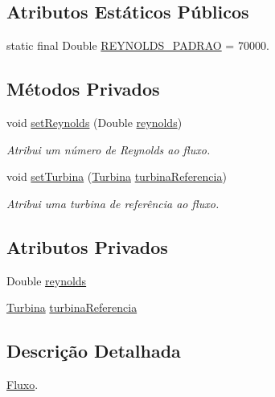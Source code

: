 \subsection*{Atributos Estáticos Públicos}
\begin{DoxyCompactItemize}
\item 
static final Double \hyperlink{classusina_1_1_fluxo_ad85aeeb220a6c87764d29ce36bb8cc26}{R\-E\-Y\-N\-O\-L\-D\-S\-\_\-\-P\-A\-D\-R\-A\-O} = 70000.
\end{DoxyCompactItemize}
\subsection*{Métodos Privados}
\begin{DoxyCompactItemize}
\item 
void \hyperlink{classusina_1_1_fluxo_a1c204862a651d75929b078355b512823}{set\-Reynolds} (Double \hyperlink{classusina_1_1_fluxo_a185fed046eefce4fa8f8bb10fde8296d}{reynolds})
\begin{DoxyCompactList}\small\item\em Atribui um número de Reynolds ao fluxo. \end{DoxyCompactList}\item 
void \hyperlink{classusina_1_1_fluxo_a3bb30b3608a7ab915ff332018a18d81f}{set\-Turbina} (\hyperlink{classusina_1_1_turbina}{Turbina} \hyperlink{classusina_1_1_fluxo_aee04932f02b1bfad1bf79cc80a1df203}{turbina\-Referencia})
\begin{DoxyCompactList}\small\item\em Atribui uma turbina de referência ao fluxo. \end{DoxyCompactList}\end{DoxyCompactItemize}
\subsection*{Atributos Privados}
\begin{DoxyCompactItemize}
\item 
Double \hyperlink{classusina_1_1_fluxo_a185fed046eefce4fa8f8bb10fde8296d}{reynolds}
\item 
\hyperlink{classusina_1_1_turbina}{Turbina} \hyperlink{classusina_1_1_fluxo_aee04932f02b1bfad1bf79cc80a1df203}{turbina\-Referencia}
\end{DoxyCompactItemize}


\subsection{Descrição Detalhada}
\hyperlink{classusina_1_1_fluxo}{Fluxo}. 


